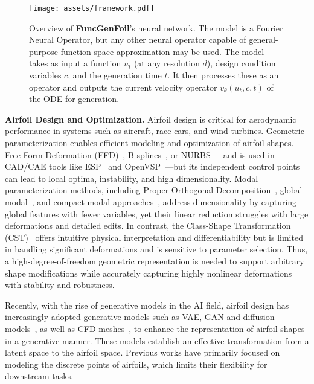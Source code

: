 \begin{figure*}[t]
    \small
    \centering
    \texttt{[image: assets/framework.pdf]}
    \caption{Overview of \textbf{FuncGenFoil}'s neural network.  
    The model is a Fourier Neural Operator, but any other neural operator capable of general-purpose function-space approximation may be used.  
    The model takes as input a function $u_t$ (at any resolution $d$), design condition variables $c$, and the generation time $t$. It then processes these as an operator and outputs the current velocity operator $v_{\theta}(u_t, c, t)$ of the ODE for generation.}
    \label{fig:velocity}
\end{figure*}

    
\noindent \textbf{Airfoil Design and Optimization.}
Airfoil design is critical for aerodynamic performance in systems such as aircraft, race cars, and wind turbines. Geometric parameterization enables efficient modeling and optimization of airfoil shapes. Free-Form Deformation (FFD)~\cite{mortenson1999mathematics}, B-splines~\cite{farin2002curves}, or NURBS~\cite{schoenberg1964spline}—and is used in CAD/CAE tools like ESP~\cite{dannenhoffer2024overview} and OpenVSP~\cite{hahn2010vehicle}—but its independent control points can lead to local optima, instability, and high dimensionality. Modal parameterization methods, including Proper Orthogonal Decomposition~\cite{berkooz1993proper}, global modal~\cite{bruls2007global}, and compact modal approaches~\cite{li2021adjoint}, address dimensionality by capturing global features with fewer variables, yet their linear reduction struggles with large deformations and detailed edits. In contrast, the Class-Shape Transformation (CST)~\cite{kulfan2008universal} offers intuitive physical interpretation and differentiability but is limited in handling significant deformations and is sensitive to parameter selection. Thus, a high-degree-of-freedom geometric representation is needed to support arbitrary shape modifications while accurately capturing highly nonlinear deformations with stability and robustness.

Recently, with the rise of generative models in the AI field, airfoil design has increasingly adopted generative models such as VAE, GAN and diffusion models~\cite{chen2021bezierganautomaticgenerationsmooth,li2022machine,xie2024parametric,yangaobo,zhenweidiffAirfoil,liu2024afbench}, as well as CFD meshes~\cite{weizhen2023,ZhenWeiDeepGeo2024}, to enhance the representation of airfoil shapes in a generative manner. These models establish an effective transformation from a latent space to the airfoil space. Previous works have primarily focused on modeling the discrete points of airfoils, which limits their flexibility for downstream tasks.









